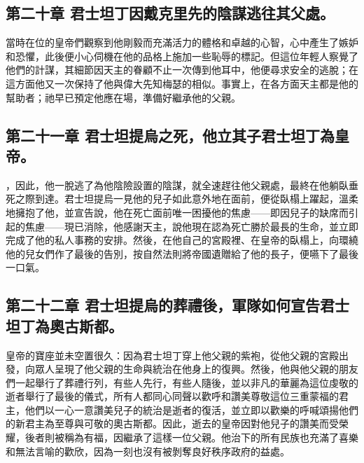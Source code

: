 \subsection{第二十章 君士坦丁因戴克里先的陰謀逃往其父處。}

當時在位的皇帝們觀察到他剛毅而充滿活力的體格和卓越的心智，心中產生了嫉妒和恐懼，此後便小心伺機在他的品格上施加一些恥辱的標記。但這位年輕人察覺了他們的計謀，其細節因天主的眷顧不止一次傳到他耳中，他便尋求安全的逃脫；在這方面他又一次保持了他與偉大先知梅瑟的相似。事實上，在各方面天主都是他的幫助者；祂早已預定他應在場，準備好繼承他的父親。\par


\subsection{第二十一章 君士坦提烏之死，他立其子君士坦丁為皇帝。}

，因此，他一脫逃了為他陰險設置的陰謀，就全速趕往他父親處，最終在他躺臥垂死之際到達。君士坦提烏一見他的兒子如此意外地在面前，便從臥榻上躍起，溫柔地擁抱了他，並宣告說，他在死亡面前唯一困擾他的焦慮——即因兒子的缺席而引起的焦慮——現已消除，他感謝天主，說他現在認為死亡勝於最長的生命，並立即完成了他的私人事務的安排。然後，在他自己的宮殿裡、在皇帝的臥榻上，向環繞他的兒女們作了最後的告別，按自然法則將帝國遺贈給了他的長子，便嚥下了最後一口氣。\par


\subsection{第二十二章 君士坦提烏的葬禮後，軍隊如何宣告君士坦丁為奧古斯都。}

皇帝的寶座並未空置很久：因為君士坦丁穿上他父親的紫袍，從他父親的宮殿出發，向眾人呈現了他父親的生命與統治在他身上的復興。然後，他與他父親的朋友們一起舉行了葬禮行列，有些人先行，有些人隨後，並以非凡的華麗為這位虔敬的逝者舉行了最後的儀式，所有人都同心同聲以歡呼和讚美尊敬這位三重蒙福的君主，他們以一心一意讚美兒子的統治是逝者的復活，並立即以歡樂的呼喊頌揚他們的新君主為至尊與可敬的奧古斯都。因此，逝去的皇帝因對他兒子的讚美而受榮耀，後者則被稱為有福，因繼承了這樣一位父親。他治下的所有民族也充滿了喜樂和無法言喻的歡欣，因為一刻也沒有被剝奪良好秩序政府的益處。\par

